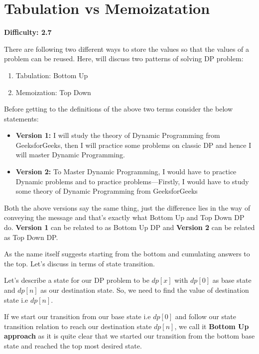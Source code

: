 
\section{Tabulation vs Memoizatation
  \label{secGFGDPTabVsMemo}}

\textbf{Difficulty: 2.7}

There are following two different ways to store the values so that the
values of a problem can be reused. Here, will discuss two patterns of
solving DP problem:
\begin{enumerate}[label=\textbf{\arabic*.}]
\item Tabulation: Bottom Up
\item Memoization: Top Down
\end{enumerate}
Before getting to the definitions of the above two terms consider the below
statements:
\begin{itemize}%
\item \textbf{Version 1:} I will study the theory of Dynamic Programming
  from GeeksforGeeks, then I will practice some problems on classic DP and
  hence I will master Dynamic Programming.
\item \textbf{Version 2:} To Master Dynamic Programming, I would have to
  practice Dynamic problems and to practice problems---Firstly, I would have
  to study some theory of Dynamic Programming from GeeksforGeeks
\end{itemize}
Both the above versions say the same thing, just the difference lies in the
way of conveying the message and that's exactly what Bottom Up and Top Down
DP do. \textbf{Version 1} can be related to as Bottom Up DP and
\textbf{Version 2} can be related as Top Down DP.


As the name itself suggests starting from the bottom and cumulating answers
to the top. Let's discuss in terms of state transition.

Let's describe a state for our DP problem to be $dp[x]$ with $dp[0]$ as
base state and $dp[n]$ as our destination state. So, we need to find the
value of destination state i.e $dp[n]$.

If we start our transition from our base state i.e $dp[0]$ and follow our
state transition relation to reach our destination state $dp[n]$, we call it
\textbf{Bottom Up approach} as it is quite clear that we started our
transition from the bottom base state and reached the top most desired
state.

